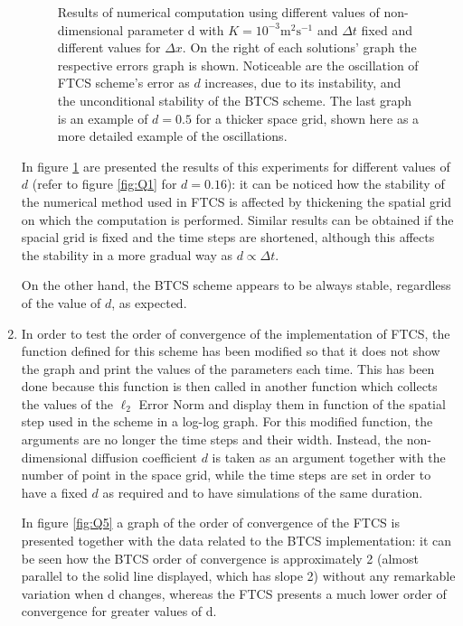 \documentclass[12pt]{article}
\begin{document}
\begin{enumerate}
\begin{figure}[!tbh]
\caption{Results of numerical computation using different values of non-dimensional parameter d with $K=10^{-3}\text{m}^{2}\text{s}^{-1}$ and $\Delta t$ fixed and different values for $\Delta x$. On the right of each solutions' graph the respective errors graph is shown. Noticeable are the oscillation of FTCS scheme's error as $d$ increases, due to its instability, and the unconditional stability of the BTCS scheme. The last graph is an example of $d=0.5$ for a thicker space grid, shown here as a more detailed example of the oscillations.
\label{fig:Q4}}
\end{figure}

In figure \ref{fig:Q4} are presented the results of this experiments for different values of $d$ (refer to figure \ref{fig:Q1} for $d=0.16$): it can be noticed how the stability of the numerical method used in FTCS is affected by thickening the spatial grid on which the computation is performed. Similar results can be obtained if the spacial grid is fixed and the time steps are shortened, although this affects the stability in a more gradual way as $d\propto \Delta t$. \par
On the other hand, the BTCS scheme appears to be always stable, regardless of the value of $d$, as expected.

\item In order to test the order of convergence of the implementation of FTCS, the function defined for this scheme has been modified so that it does not show the graph and print the values of the parameters each time. This has been done because this function is then called in another function which collects the values of the $\ell_2$ Error Norm and display them in function of the spatial step used in the scheme in a log-log graph.
For this modified function, the arguments are no longer the time steps and their width. Instead, the non-dimensional diffusion coefficient $d$ is taken as an argument together with the number of point in the space grid, while the time steps are set in order to have a fixed $d$ as required and to have simulations of the same duration.\par
In figure \ref{fig:Q5} a graph of the order of convergence of the FTCS is presented together with the data related to the BTCS implementation: it can be seen how the BTCS order of convergence is approximately 2 (almost parallel to the solid line displayed, which has slope 2) without any remarkable variation when d changes, whereas the FTCS presents a much lower order of convergence for greater values of d.


\end{enumerate}
\end{document}
